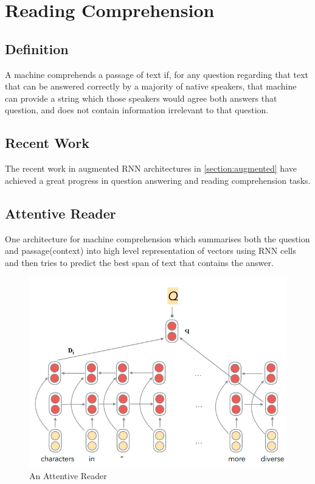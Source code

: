 \section{Reading Comprehension}

\subsection{Definition}
A machine comprehends a passage of text if, for any question regarding that text that can be answered correctly by a majority of native speakers, that machine can provide a string which those speakers would agree both answers that question, and does not contain information irrelevant to that question.

\subsection{Recent Work}
The recent work in augmented RNN architectures in \ref{section:augmented} have achieved a great progress in question answering and reading comprehension tasks.

\subsection{Attentive Reader}
One architecture\cite{DBLP:journals/corr/ChenBM16a} for machine comprehension which summarises both the question and passage(context) into high level representation of vectors using RNN cells and then tries to predict the best span of text that contains the answer. 

\begin{figure}[H]%
      \center%
        \includegraphics[width=.7\textwidth]{images/komy/attentive-reader.png}%
        \caption[Attentive Reader]{An Attentive Reader}%
  \end{figure}
